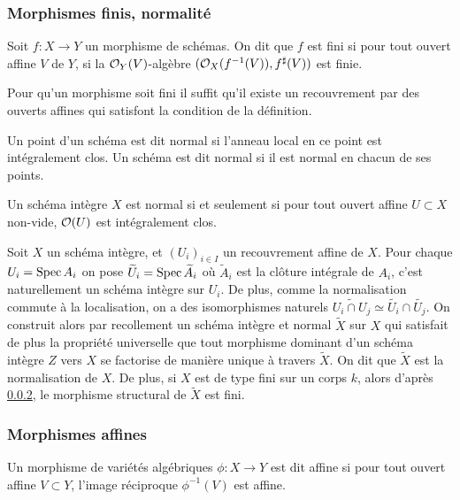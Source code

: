\subsubsection{Morphismes finis, normalité}

\begin{defn}
Soit $f:X \rightarrow Y$ un morphisme de schémas. On dit que $f$ est fini si pour tout ouvert affine $V$ de $Y$, si la $\mathcal{O}_Y(V)$-algèbre $(\mathcal{O}_X(f^{-1}(V)), f^\sharp(V))$ est finie.
\end{defn}

\begin{rem}
Pour qu'un morphisme soit fini il suffit qu'il existe un recouvrement par des ouverts affines qui satisfont la condition de la définition.
\end{rem}


\begin{defn}
Un point d'un schéma est dit normal si l'anneau local en ce point est intégralement clos.
Un schéma est dit normal si il est normal en chacun de ses points.
\end{defn}

\begin{prop}
Un schéma intègre $X$ est normal si et seulement si pour tout ouvert affine $U\subset X$ non-vide, $\mathcal{O}(U)$ est intégralement clos.
\end{prop}

Soit $X$ un schéma intègre, et $(U_i)_{i\in I}$ un recouvrement affine de $X$. Pour chaque $U_i=\operatorname{Spec} A_i$ on pose $\widetilde{U}_i=\operatorname{Spec} \widetilde{A}_i$ où $\widetilde{A}_i$ est la clôture intégrale de $A_i$, c'est naturellement un schéma intègre sur $U_i$. De plus, comme la normalisation commute à la localisation, on a des isomorphismes naturels $\widetilde{U_i\cap U_j}\simeq \widetilde{U_i}\cap \widetilde{U_j}$. On construit alors par recollement un schéma intègre et normal $\widetilde{X}$ sur $X$ qui satisfait de plus la propriété universelle que tout morphisme dominant d'un schéma intègre $Z$ vers $X$ se factorise de manière unique à travers $\widetilde{X}$. On dit que $\widetilde{X}$ est la normalisation de $X$. De plus, si $X$ est de type fini sur un corps $k$, alors d'après \ref{}, le morphisme structural de $\widetilde{X}$ est fini.

\subsubsection{Morphismes affines}

\begin{defn}
Un morphisme de variétés algébriques $\phi: X\rightarrow Y$ est dit affine si pour tout ouvert affine $V\subset Y$, l'image réciproque $\phi^{-1}(V)$ est affine.
\end{defn}

